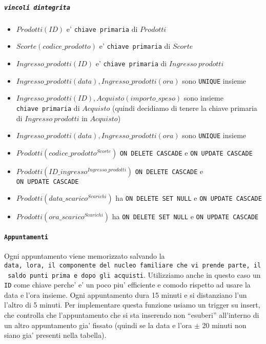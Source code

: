 \documentclass[]{article}
\providecommand{\tightlist}{%
  \setlength{\itemsep}{0pt}\setlength{\parskip}{0pt}}
\let\oldparagraph\paragraph
\renewcommand{\paragraph}[1]{\oldparagraph{#1}\mbox{}}
\let\oldsubparagraph\subparagraph
\renewcommand{\subparagraph}[1]{\oldsubparagraph{#1}\mbox{}}
\begin{document}
\hypertarget{vincoli-dintegrita-2}{%
\subparagraph{\texorpdfstring{\texttt{vincoli\ d\textquotesingle{}integrita\textquotesingle{}}}{vincoli d'integrita'}}\label{vincoli-dintegrita-2}}

\begin{itemize}
\tightlist
\item
  \(Prodotti(ID)\) e' \texttt{chiave\ primaria} di \(Prodotti\)
\item
  \(Scorte(codice\_prodotto)\) e' \texttt{chiave\ primaria} di
  \(Scorte\)
\item
  \(Ingresso\_prodotti(ID)\) e' \texttt{chiave\ primaria} di
  \(Ingresso\ prodotti\)
\item
  \(Ingresso\_prodotti(data), Ingresso\_prodotti(ora)\) sono
  \texttt{UNIQUE} insieme
\item
  \(Ingresso\_prodotti(ID), Acquisto(importo\_speso)\) sono insieme
  \texttt{chiave\ primaria} di \(Acquisto\) (quindi decidiamo di tenere
  la chiave primaria di \(Ingresso\ prodotti\) in \(Acquisto\))
\item
  \(Ingresso\_prodotti(data), Ingresso\_prodotti(ora)\) sono
  \texttt{UNIQUE} insieme
\item
  \(Prodotti(codice\_prodotto^{Scorte})\) \texttt{ON\ DELETE\ CASCADE} e
  \texttt{ON\ UPDATE\ CASCADE}
\item
  \(Prodotti(ID\_ingresso^{Ingresso\_prodotti})\)
  \texttt{ON\ DELETE\ CASCADE} e \texttt{ON\ UPDATE\ CASCADE}
\item
  \(Prodotti(data\_scarico^{Scarichi})\) ha
  \texttt{ON\ DELETE\ SET\ NULL} e \texttt{ON\ UPDATE\ CASCADE}
\item
  \(Prodotti(ora\_scarico^{Scarichi})\) ha
  \texttt{ON\ DELETE\ SET\ NULL} e \texttt{ON\ UPDATE\ CASCADE}
\end{itemize}

\hypertarget{appuntamenti}{%
\paragraph{\texorpdfstring{\texttt{Appuntamenti}}{Appuntamenti}}\label{appuntamenti}}

Ogni appuntamento viene memorizzato salvando la
\texttt{data,\ l\textquotesingle{}ora,\ il\ componente\ del\ nucleo\ familiare\ che\ vi\ prende\ parte,\ il\ saldo\ punti\ prima\ e\ dopo\ gli\ acquisti}.
Utilizziamo anche in questo caso un \texttt{ID} come chiave perche' e'
un poco piu' efficiente e comodo rispetto ad usare la data e l'ora
insieme. Ogni appuntamento dura 15 minuti e si distanziano l'un l'altro
di 5 minuti. Per implementare questa funzione usiamo un trigger su
insert, che controlla che l'appuntamento che si sta inserendo non
``esuberi'' all'interno di un altro appuntamento gia' fissato (quindi se
la data e l'ora \(\pm\) 20 minuti non siano gia' presenti nella
tabella).
\end{document}
